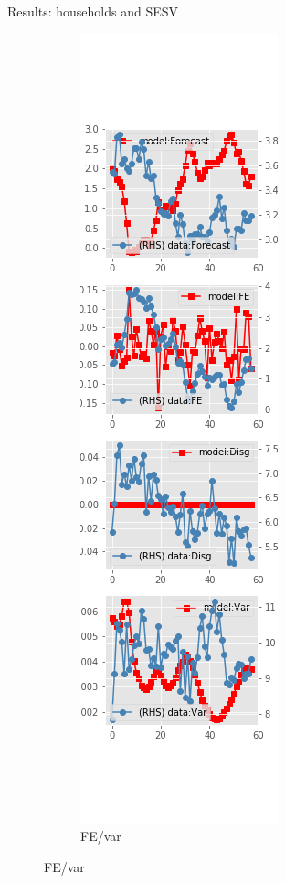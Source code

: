 \documentclass{beamer}
\begin{document}
\begin{frame}{Results: households and SESV}
\begin{figure}[ht]
\begin{subfigure}[b]{0.19\textwidth}
		\end{subfigure}
		\hfill
		\begin{subfigure}[b]{0.19\textwidth}
			\caption{FE/var}
			\includegraphics[width=\textwidth, height = 0.8\textheight]{figuresDraft/sce_se_est_sv_diag3.png}

\end{subfigure}
\end{figure}
\end{frame}
\end{document}
